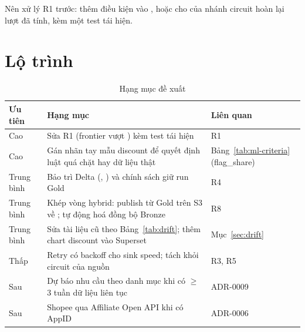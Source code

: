 \begin{riskbox}[Ưu tiên xử lý]
Nên xử lý R1 trước: thêm điều kiện  vào , hoặc cho  của nhánh circuit hoàn lại lượt đã tính,
kèm một test tái hiện.
\end{riskbox}

\section{Lộ trình}
\begin{xltabular}{\linewidth}{@{}L{20mm}Y L{40mm}@{}}
  \caption{Hạng mục đề xuất}\label{tab:roadmap}\\
  \toprule
  \textbf{Ưu tiên} & \textbf{Hạng mục} & \textbf{Liên quan} \\
  \midrule
  Cao & Sửa R1 (frontier vượt ) kèm test tái hiện & R1 \\
  Cao & Gán nhãn tay mẫu discount để quyết định luật quá chặt hay dữ liệu thật & Bảng~\ref{tab:ml-criteria} (flag\_share) \\
  Trung bình & Bảo trì Delta (, ) và chính sách giữ run Gold & R4 \\
  Trung bình & Khép vòng hybrid: publish từ Gold trên S3 về ; tự động hoá đồng bộ Bronze & R8 \\
  Trung bình & Sửa tài liệu cũ theo Bảng~\ref{tab:drift}; thêm chart discount vào Superset & Mục~\ref{sec:drift} \\
  Thấp & Retry có backoff cho sink speed; tách  khỏi circuit của nguồn & R3, R5 \\
  Sau & Dự báo nhu cầu theo danh mục khi có $\ge$ 3 tuần dữ liệu liên tục & ADR-0009 \\
  Sau & Shopee qua Affiliate Open API khi có AppID & ADR-0006 \\
  \bottomrule
\end{xltabular}
